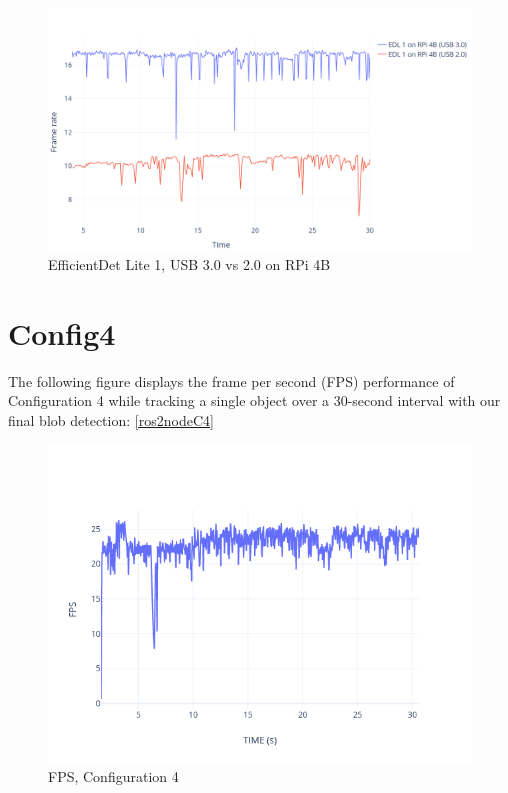 \begin{figure}[H]
    \centering
    \includegraphics[width=\textwidth]{fig/plots/EDL1-USB_3_vs_2.png}
    \caption{EfficientDet Lite 1, USB 3.0 vs 2.0 on RPi 4B}
    \label{fig:edl1-usb_2_vs_3}
\end{figure}

\newpage

\section{Config4}

The following figure displays the frame per second (FPS) performance of Configuration 4 while tracking a single object over a 30-second interval with our final blob detection: \ref{ros2nodeC4}

\begin{figure}[h]
    \centering
    \includegraphics[width=\textwidth]{sindrebilder/config4_fps.png}
    \caption{FPS, Configuration 4}
    \label{fig:fpsConfig4}
\end{figure}

